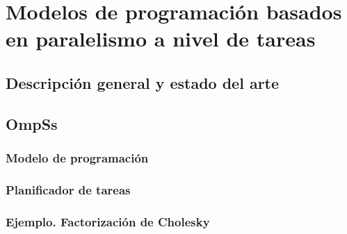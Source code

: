 \newpage
\thispagestyle{empty}
\mbox{}

\chapter{Modelos de programación basados en paralelismo a nivel de tareas}
\label{ch:chapter3}

\section{Descripción general y estado del arte}

\section{OmpSs}

\subsection{Modelo de programación}

\subsection{Planificador de tareas}

\subsection{Ejemplo. Factorización de Cholesky}


